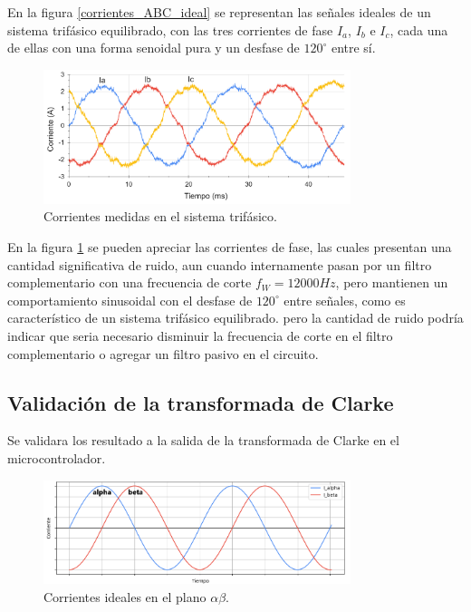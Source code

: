 \documentclass[11pt]{report}
\begin{document}
En la figura \ref{corrientes_ABC_ideal} se representan las señales ideales de un sistema trifásico equilibrado, con las tres corrientes de fase $I_a$, $I_b$ e $I_c$, cada una de ellas con una forma senoidal pura y un desfase de $120^\circ$ entre sí.

\begin{figure}[ht]
	\centering
	\includegraphics[width=0.8\textwidth]{imagenes/Corrientes_ABC.png}
	\caption{Corrientes medidas en el sistema trifásico.}
	\label{corrientes_ABC}
\end{figure}
\FloatBarrier

En la figura \ref{corrientes_ABC} se pueden apreciar las corrientes de fase, las cuales presentan una cantidad significativa de ruido, aun cuando internamente pasan por un filtro complementario con una frecuencia de corte $f_W=12000Hz$, pero mantienen un comportamiento sinusoidal con el desfase de $120^\circ$ entre señales, como es característico de un sistema trifásico equilibrado. pero la cantidad de ruido podría indicar que seria necesario disminuir la frecuencia de corte en el filtro complementario o agregar un filtro pasivo en el circuito.

\newpage
\subsection{Validación de la transformada de Clarke}

Se validara los resultado a la salida de la transformada de Clarke en el microcontrolador.

\begin{figure}[ht]
	\centering
	\includegraphics[width=0.8\textwidth]{imagenes/Corrientes_AlphaBeta_ideal.png}
	\caption{Corrientes ideales en el plano $\alpha\beta$.}
	\label{corrientes_alpha_beta_ideal}
\end{figure}
\FloatBarrier
\end{document}
